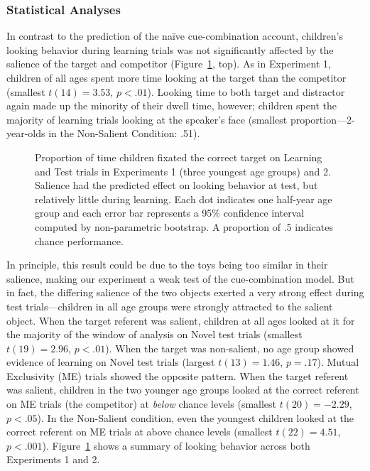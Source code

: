 \documentclass[man,floatsintext]{apa6}
\begin{document}
\subsubsection{Statistical Analyses}

In contrast to the prediction of the na\"{i}ve cue-combination account, children's looking behavior during learning trials was not significantly affected by the salience of the target and competitor (Figure~\ref{fig:exp1_2}, top). As in Experiment 1, children of all ages spent more time looking at the target than the competitor (smallest $t(14)  = 3.53$, $p < .01$). Looking time to both target and distractor again made up the minority of their dwell time, however; children spent the majority of learning trials looking at the speaker's face (smallest proportion---2-year-olds in the Non-Salient Condition: .51).


\begin{figure}[t]
	\caption{\label{fig:exp1_2} Proportion of time children fixated the correct target on Learning and Test trials in Experiments 1 (three youngest age groups) and 2. Salience had the predicted effect on looking behavior at test, but relatively little during learning. Each dot indicates one half-year age group and each error bar represents a 95\% confidence interval computed by non-parametric bootstrap. A proportion of .5 indicates chance performance.}
\end{figure}

In principle, this result could be due to the toys being too similar in their salience, making our experiment a weak test of the cue-combination model. But in fact, the differing salience of the two objects exerted a very strong effect during test trials---children in all age groups were strongly attracted to the salient object. When the target referent was salient, children at all ages looked at it for the majority of the window of analysis on Novel test trials (smallest $t(19)  = 2.96$, $p < .01$). When the target was non-salient, no age group showed evidence of learning on Novel test trials (largest $t(13)  = 1.46$, $p = .17$). Mutual Exclusivity (ME) trials showed the opposite pattern. When the target referent was salient, children in the two younger age groups looked at the correct referent on ME trials (the competitor) at \emph{below} chance levels (smallest $t(20) = -2.29$, $p < .05$). In the Non-Salient condition, even the youngest children looked at the correct referent on ME trials at above chance levels (smallest $t(22) = 4.51$, $p < .001$). Figure~\ref{fig:exp1_2} shows a summary of looking behavior across both Experiments 1 and 2.
\end{document}
